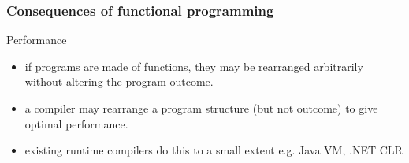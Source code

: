 \begin{frame}
\frametitle{Consequences of functional programming}
\begin{block}{Performance}
\begin{itemize}
\item<1-> if programs are made of functions, they may be rearranged arbitrarily without altering the program outcome.
\item<2-> a compiler may rearrange a program structure (but not outcome) to give optimal performance.
\item<3-> existing runtime compilers do this to a small extent e.g. Java VM, .NET CLR
\end{itemize}
\end{block}
\end{frame}

